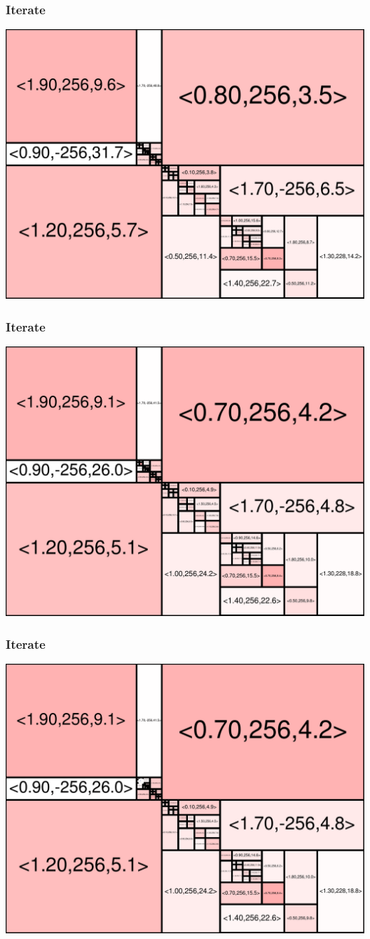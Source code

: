 \begin{frame}
\frametitle{Iterate}\begin{centering}\includegraphics[width=8.5 cm]{remy-graph/graph/test81.pdf}

\end{centering}\end{frame}


\begin{frame}
\frametitle{Iterate}\begin{centering}\includegraphics[width=8.5 cm]{remy-graph/graph/test82.pdf}

\end{centering}\end{frame}


\begin{frame}
\frametitle{Iterate}\begin{centering}\includegraphics[width=8.5 cm]{remy-graph/graph/test83.pdf}

\end{centering}\end{frame}


